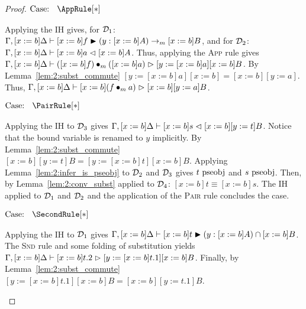 \begin{proof}
    $\text{Case: }\begin{array}{c} \AppRule[*] \end{array}$
    \begin{proofcase}
        Applying the IH gives, for $\mathcal{D}_{1}$: $\Gamma, [x := b]\Delta \vdash [x := b]f \blacktriangleright (y : [x := b]A) \to_m [x := b]B$, and for $\mathcal{D}_{2}$: $\Gamma, [x := b]\Delta \vdash [x := b]a \vartriangleleft [x := b]A$.
        Thus, applying the \textsc{App} rule gives $\Gamma, [x := b]\Delta \vdash ([x := b]f) \bullet_{m} ([x := b]a) \vartriangleright [y := [x := b]a][x := b]B$.
        By Lemma~\ref{lem:2:subst_commute} $[y := [x := b]a][x := b] = [x := b][y := a]$.
        Thus, $\Gamma, [x := b]\Delta \vdash [x := b](f \bullet_{m} a) \vartriangleright [x := b][y := a]B$.
    \end{proofcase}

    $\text{Case: }\begin{array}{c} \PairRule[*] \end{array}$
    \begin{proofcase}
        Applying the IH to $\mathcal{D}_{3}$ gives $\Gamma, [x := b]\Delta \vdash [x := b]s \vartriangleleft [x := b][y := t]B$.
        Notice that the bound variable is renamed to $y$ implicitly.
        By Lemma~\ref{lem:2:subst_commute} $[x := b][y := t]B = [y := [x := b]t][x := b]B$.
        Applying Lemma~\ref{lem:2:infer_is_pseobj} to $\mathcal{D}_{2}$ and $\mathcal{D}_{3}$ gives $t~\mbox{\normalfont pseobj}$ and $s~\mbox{\normalfont pseobj}$.
        Then, by Lemma~\ref{lem:2:conv_subst} applied to $\mathcal{D}_{4}$: $[x := b]t \equiv [x := b]s$.
        The IH applied to $\mathcal{D}_{1}$ and $\mathcal{D}_{2}$ and the application of the \textsc{Pair} rule concludes the case.
    \end{proofcase}

    $\text{Case: }\begin{array}{c} \SecondRule[*] \end{array}$
    \begin{proofcase}
        Applying the IH to $\mathcal{D}_{1}$ gives $\Gamma, [x := b]\Delta \vdash [x := b]t \blacktriangleright (y : [x := b]A) \cap [x := b]B$.
        The \textsc{Snd} rule and some folding of substitution yields $\Gamma, [x := b]\Delta \vdash [x := b]t.2 \vartriangleright [y := [x := b]t.1][x := b]B$.
        Finally, by Lemma~\ref{lem:2:subst_commute} $[y := [x := b]t.1][x := b]B = [x := b][y := t.1]B$.
    \end{proofcase}


\end{proof}
